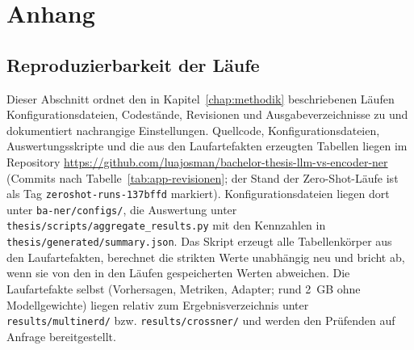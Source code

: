 %

\chapter{Anhang}
\label{chap:anhang}

\section{Reproduzierbarkeit der Läufe}
\label{app:reproduzierbarkeit}

Dieser Abschnitt ordnet den in Kapitel~\ref{chap:methodik} beschriebenen
Läufen Konfigurationsdateien, Codestände, Revisionen und
Ausgabeverzeichnisse zu und dokumentiert nachrangige Einstellungen.
Quellcode, Konfigurationsdateien, Auswertungsskripte und die aus den
Laufartefakten erzeugten Tabellen liegen im Repository
\url{https://github.com/luajosman/bachelor-thesis-llm-vs-encoder-ner}
(Commits nach Tabelle~\ref{tab:app-revisionen}; der Stand der
Zero-Shot-Läufe ist als Tag \texttt{zeroshot-runs-137bffd} markiert).
Konfigurationsdateien liegen dort unter \texttt{ba-ner/configs/}, die
Auswertung unter \texttt{thesis/scripts/aggregate\_results.py} mit den
Kennzahlen in \texttt{thesis/generated/summary.json}.
Das Skript erzeugt alle Tabellenkörper aus den Laufartefakten, berechnet
die strikten Werte unabhängig neu und bricht ab, wenn sie von den in den
Läufen gespeicherten Werten abweichen.
Die Laufartefakte selbst (Vorhersagen, Metriken, Adapter; rund 2~GB ohne
Modellgewichte) liegen relativ zum Ergebnisverzeichnis unter
\texttt{results/multinerd/} bzw. \texttt{results/crossner/} und werden
den Prüfenden auf Anfrage bereitgestellt.

